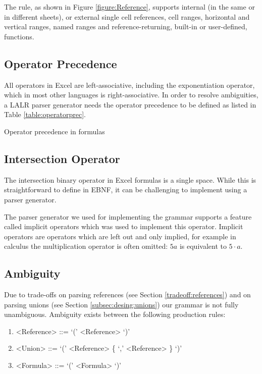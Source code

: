 \documentclass[times]{smrauth}
\begin{document}
The  rule, as shown in Figure \ref{figure:Reference}, supports internal (in the same or in different sheets), or external single cell references, cell ranges, horizontal and vertical ranges, named ranges and reference-returning, built-in or user-defined, functions.

\subsection{Operator Precedence}
\label{sec:operatorprecedence}

All operators in Excel are left-associative, including the exponentiation operator, which in most other languages is right-associative.
In order to resolve ambiguities, a LALR parser generator needs the operator precedence to be defined as listed in Table \ref{table:operatorprec}.

\begin{table}[]
	\centering
	\caption{Operator precedence in formulas}
	\label{table:operatorprec}
	
\end{table}

\subsection{Intersection Operator}
\label{sec:intersection}
The intersection binary operator in Excel formulas is a single space.
While this is straightforward to define in EBNF, it can be challenging to implement using a parser generator.

The parser generator we used for implementing the grammar supports a feature called implicit operators which was used to implement this operator.
Implicit operators are operators which are left out and only implied, for example in calculus the multiplication operator is often omitted: $5a$ is equivalent to $5 \cdot a$.

\subsection{Ambiguity}
\label{sec:ambiguity}

Due to trade-offs on parsing references (see Section \ref{tradeoff:references}) and on parsing unions (see Section \ref{subsec:desing:unions}) our grammar is not fully unambiguous.
Ambiguity exists between the following production rules:
\begin{enumerate}
	\item \begin{grammar}<Reference> ::= `(' <Reference> `)'\end{grammar}
	\item \begin{grammar}<Union> ::= `(' <Reference> \{ `,' <Reference> \} `)'\end{grammar}
	\item \begin{grammar}<Formula> ::= `(' <Formula> `)'\end{grammar}
\end{enumerate}
\end{document}
